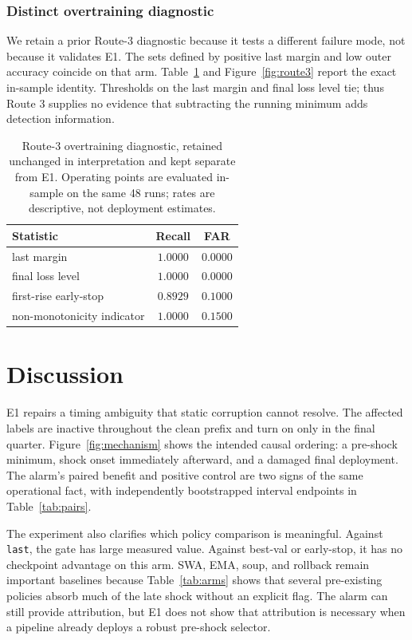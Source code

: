 \documentclass{article} %
\theoremstyle{remark}
\begin{document}
\subsubsection{Distinct overtraining diagnostic}

We retain a prior Route-3 diagnostic because it tests a different failure mode, not because it
validates E1. The sets defined by positive last margin and low outer accuracy coincide on that
arm. Table~\ref{tab:route3} and Figure~\ref{fig:route3} report the exact in-sample identity.
Thresholds on the last margin and final loss level tie; thus Route 3 supplies no evidence that
subtracting the running minimum adds detection information.

\begin{table}[t]
\centering
\caption{Route-3 overtraining diagnostic, retained unchanged in interpretation and kept separate
from E1. Operating points are evaluated in-sample on the same 48 runs; rates are descriptive, not
deployment estimates.}
\label{tab:route3}
\small
\begin{tabular}{lcc}
\toprule
\textbf{Statistic} & \textbf{Recall} & \textbf{FAR} \\
\midrule
last margin & $1.0000$ & $0.0000$ \\
final loss level & $1.0000$ & $0.0000$ \\
first-rise early-stop & $0.8929$ & $0.1000$ \\
non-monotonicity indicator & $1.0000$ & $0.1500$ \\
\bottomrule
\end{tabular}
\end{table}

\newpage
\section{Discussion}
\label{sec:discussion}

E1 repairs a timing ambiguity that static corruption cannot resolve. The affected labels are
inactive throughout the clean prefix and turn on only in the final quarter. Figure~\ref{fig:mechanism}
shows the intended causal ordering: a pre-shock minimum, shock onset immediately afterward, and a
damaged final deployment. The alarm's paired benefit and positive control are two signs of the same
operational fact, with independently bootstrapped interval endpoints in Table~\ref{tab:pairs}.

The experiment also clarifies which policy comparison is meaningful. Against \texttt{last}, the
gate has large measured value. Against best-val or early-stop, it has no checkpoint advantage on
this arm. SWA, EMA, soup, and rollback remain important baselines because Table~\ref{tab:arms}
shows that several pre-existing policies absorb much of the late shock without an explicit flag.
The alarm can still provide attribution, but E1 does not show that attribution is necessary when a
pipeline already deploys a robust pre-shock selector.
\end{document}
